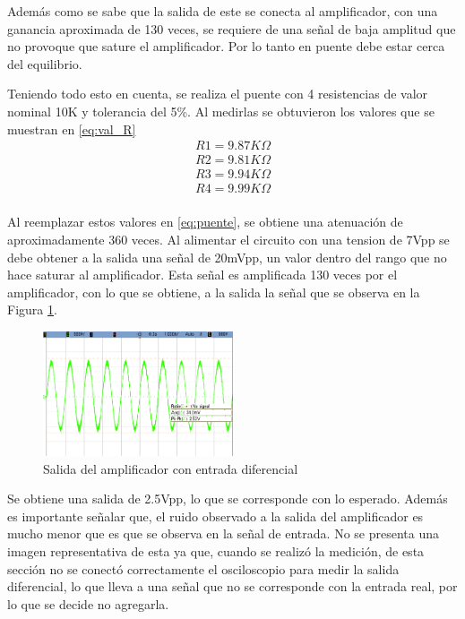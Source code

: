 Adem\'as como se sabe que la salida de este se conecta al amplificador, con una ganancia aproximada de 130 veces, se requiere de una se\~nal de baja amplitud que no provoque que sature el amplificador. Por lo tanto en puente debe estar cerca del equilibrio.

Teniendo todo esto en cuenta, se realiza el puente con 4 resistencias de valor nominal 10K y tolerancia del 5\%. Al medirlas se obtuvieron los valores que se muestran en \ref{eq:val_R}
\begin{equation}
    \begin{array}{llll}
    R1 = 9.87 K\Omega\\
    R2 = 9.81 K\Omega \\
    R3 = 9.94 K\Omega \\
    R4 = 9.99 K\Omega \\
    \end{array}
    \label{eq:val_R}
\end{equation}

Al reemplazar estos valores en \ref{eq:puente}, se obtiene una atenuaci\'on de aproximadamente 360 veces. Al alimentar el circuito con una tension de 7Vpp se debe obtener a la salida una se\~nal de 20mVpp, un valor dentro del rango que no hace saturar al amplificador. Esta se\~nal es amplificada 130 veces por el amplificador, con lo que se obtiene, a la salida la se\~nal que se observa en la Figura \ref{fig:inDIF}.
\begin{figure}[H]

    \centering
    \includegraphics[width=0.5\textwidth]{../EJ3/Recursos/Salida_inDIF}
    \caption{Salida del amplificador con entrada diferencial}
    \label{fig:inDIF}
\end{figure}
 
Se obtiene una salida de 2.5Vpp, lo que se corresponde con lo esperado. Adem\'as es importante se\~nalar que, el ruido observado a la salida del amplificador es mucho menor que es que se observa en la se\~nal de entrada. No se presenta una imagen representativa de esta ya que, cuando se realiz\'o la medici\'on, de esta secci\'on no se conect\'o correctamente el osciloscopio para medir la salida diferencial, lo que lleva a una se\~nal que no se corresponde con la entrada real, por lo que se decide no agregarla.


